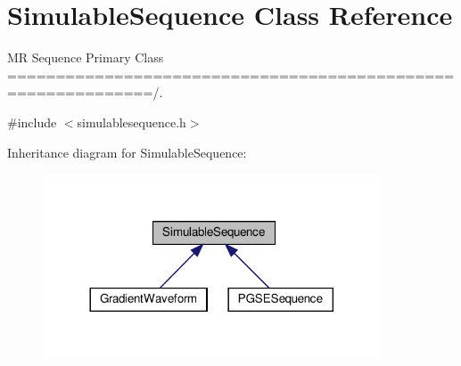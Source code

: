 \hypertarget{class_simulable_sequence}{}\section{Simulable\+Sequence Class Reference}
\label{class_simulable_sequence}


MR Sequence Primary Class =============================================================/.  




{\ttfamily \#include $<$simulablesequence.\+h$>$}



Inheritance diagram for Simulable\+Sequence\+:
\nopagebreak
\begin{figure}[H]
\begin{center}
\leavevmode
\includegraphics[width=284pt]{class_simulable_sequence__inherit__graph}
\end{center}
\end{figure}
